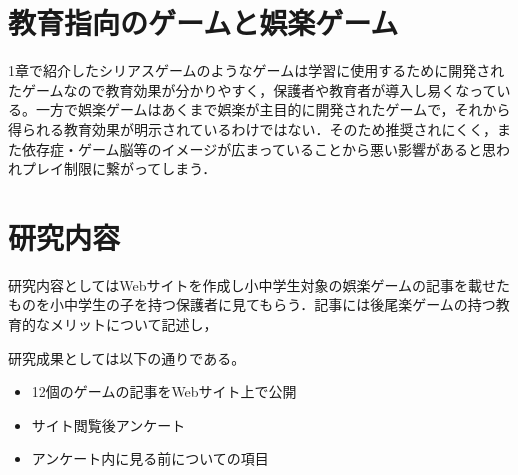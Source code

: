 \documentclass[twocolumn,10pt,a4j]{ltjsarticle}
\begin{document}


\section{教育指向のゲームと娯楽ゲーム}
1章で紹介したシリアスゲームのようなゲームは学習に使用するために開発されたゲームなので教育効果が分かりやすく，保護者や教育者が導入し易くなっている。一方で娯楽ゲームはあくまで娯楽が主目的に開発されたゲームで，それから得られる教育効果が明示されているわけではない．そのため推奨されにくく，また依存症・ゲーム脳等のイメージが広まっていることから悪い影響があると思われプレイ制限に繋がってしまう．






\section{研究内容}
研究内容としてはWebサイトを作成し小中学生対象の娯楽ゲームの記事を載せたものを小中学生の子を持つ保護者に見てもらう．記事には後尾楽ゲームの持つ教育的なメリットについて記述し，

研究成果としては以下の通りである。
\begin{itemize}
\item 12個のゲームの記事をWebサイト上で公開
\item サイト閲覧後アンケート
\item アンケート内に見る前についての項目
\end{itemize}
\end{document}
